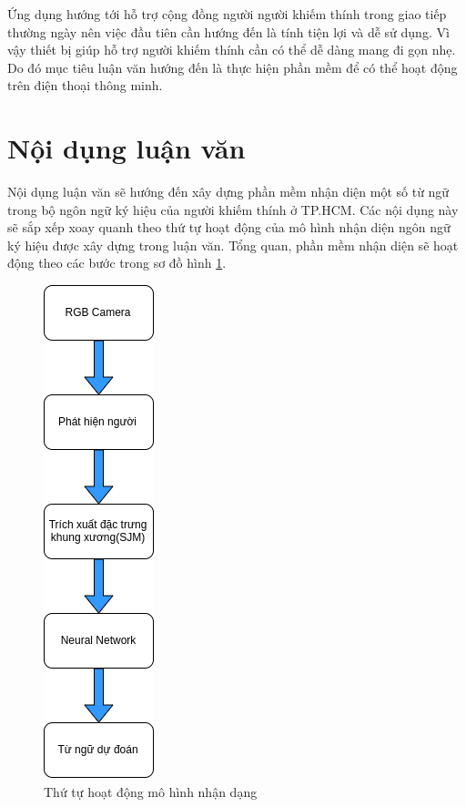 Ứng dụng hướng tới hỗ trợ cộng đồng người người khiếm thính trong giao tiếp thường ngày nên việc đầu tiên cần hướng đến là tính tiện lợi và dễ sử dụng. Vì vậy thiết bị giúp hỗ trợ người khiếm thính cần có thể dễ dàng mang đi gọn nhẹ. Do đó mục tiêu luận văn hướng đến là thực hiện phần mềm để có thể hoạt động trên điện thoại thông minh. 

\section{Nội dụng luận văn}
Nội dụng luận văn sẽ hướng đến xây dựng phần mềm nhận diện một số từ ngữ trong bộ ngôn ngữ ký hiệu của người khiếm thính ở TP.HCM. Các nội dụng này sẽ sắp xếp xoay quanh theo thứ tự hoạt động của mô hình nhận diện ngôn ngữ ký hiệu được xây dựng trong luận văn. Tổng quan, phần mềm nhận diện sẽ hoạt động theo các bước trong sơ đồ hình \ref{fig:diagram}.

\FloatBarrier
\begin{figure}[htp]
\begin{center}
\includegraphics[scale=0.7]{chap1/c1_figs/diagram.png}
\end{center}
\caption{Thứ tự hoạt động mô hình nhận dạng}
\label{fig:diagram}
\end{figure}
\FloatBarrier


